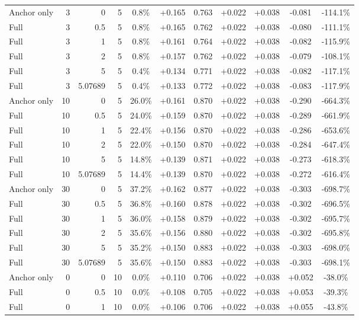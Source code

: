 \begin{table}[htbp]
\begin{tabular}{lrrrccccccc}
Anchor only & 3 & 0 & 5 & 0.8\% & +0.165 & 0.763 & +0.022 & +0.038 & -0.081 & -114.1\% \\
Full & 3 & 0.5 & 5 & 0.8\% & +0.165 & 0.762 & +0.022 & +0.038 & -0.080 & -111.1\% \\
Full & 3 & 1 & 5 & 0.8\% & +0.161 & 0.764 & +0.022 & +0.038 & -0.082 & -115.9\% \\
Full & 3 & 2 & 5 & 0.8\% & +0.157 & 0.762 & +0.022 & +0.038 & -0.079 & -108.1\% \\
Full & 3 & 5 & 5 & 0.4\% & +0.134 & 0.771 & +0.022 & +0.038 & -0.082 & -117.1\% \\
Full & 3 & 5.07689 & 5 & 0.4\% & +0.133 & 0.772 & +0.022 & +0.038 & -0.083 & -117.9\% \\
Anchor only & 10 & 0 & 5 & 26.0\% & +0.161 & 0.870 & +0.022 & +0.038 & -0.290 & -664.3\% \\
Full & 10 & 0.5 & 5 & 24.0\% & +0.159 & 0.870 & +0.022 & +0.038 & -0.289 & -661.9\% \\
Full & 10 & 1 & 5 & 22.4\% & +0.156 & 0.870 & +0.022 & +0.038 & -0.286 & -653.6\% \\
Full & 10 & 2 & 5 & 22.0\% & +0.150 & 0.870 & +0.022 & +0.038 & -0.284 & -647.4\% \\
Full & 10 & 5 & 5 & 14.8\% & +0.139 & 0.871 & +0.022 & +0.038 & -0.273 & -618.3\% \\
Full & 10 & 5.07689 & 5 & 14.4\% & +0.139 & 0.870 & +0.022 & +0.038 & -0.272 & -616.4\% \\
Anchor only & 30 & 0 & 5 & 37.2\% & +0.162 & 0.877 & +0.022 & +0.038 & -0.303 & -698.7\% \\
Full & 30 & 0.5 & 5 & 36.8\% & +0.160 & 0.878 & +0.022 & +0.038 & -0.302 & -696.5\% \\
Full & 30 & 1 & 5 & 36.0\% & +0.158 & 0.879 & +0.022 & +0.038 & -0.302 & -695.7\% \\
Full & 30 & 2 & 5 & 35.6\% & +0.156 & 0.880 & +0.022 & +0.038 & -0.302 & -695.8\% \\
Full & 30 & 5 & 5 & 35.2\% & +0.150 & 0.883 & +0.022 & +0.038 & -0.303 & -698.0\% \\
Full & 30 & 5.07689 & 5 & 35.6\% & +0.150 & 0.883 & +0.022 & +0.038 & -0.303 & -698.1\% \\
Anchor only & 0 & 0 & 10 & 0.0\% & +0.110 & 0.706 & +0.022 & +0.038 & +0.052 & -38.0\% \\
Full & 0 & 0.5 & 10 & 0.0\% & +0.108 & 0.705 & +0.022 & +0.038 & +0.053 & -39.3\% \\
Full & 0 & 1 & 10 & 0.0\% & +0.106 & 0.706 & +0.022 & +0.038 & +0.055 & -43.8\% \\

\end{tabular}
\end{table}
